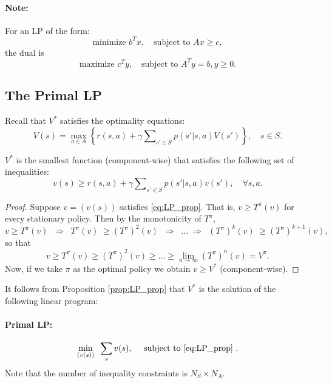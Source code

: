 \paragraph{Note:} For an LP of the form:
\begin{equation*}
 \textrm{minimize } {b^T}x,   \quad \textrm{subject to } Ax \ge c,
\end{equation*}
the dual is
\begin{equation*}
\textrm{maximize } {c^T}y,   \quad \textrm{subject to } {A^T}y = b,  y \ge 0.
\end{equation*}

\subsection{The Primal LP}
Recall that ${V^*}$ satisfies the optimality equations:
\[V(s) = \mathop {\max }\limits_{a \in A} \left\{ {r(s,a) + \gamma \sum\nolimits_{s' \in S} {p(s'|s,a)V(s')} } \right\},     \quad s \in S.\]
\begin{proposition}\label{prop:LP_prop}
${V^*}$ is the smallest function (component-wise) that satisfies the following set of
inequalities:
\begin{equation}\label{eq:LP_prop}
v(s) \ge r(s,a) + \gamma \sum\nolimits_{s' \in S} {p(s'|s,a)v(s')} ,\quad \forall s,a.
\end{equation}
\end{proposition}
\begin{proof}
Suppose $v = (v(s))$ satisfies \eqref{eq:LP_prop}. That is, $v \ge T_{}^\pi (v)$ for every stationary policy. Then by the monotonicity of $T_{}^\pi $,
\[v \ge T_{}^\pi (v)\;\; \Rightarrow \;\;T_{}^\pi (v)\; \ge {(T_{}^\pi )^2}(v)\;\; \Rightarrow \;\; \ldots \; \Rightarrow \;\;{(T_{}^\pi )^k}(v)\; \ge {(T_{}^\pi )^{k + 1}}(v),\]
so that
\[v \ge T_{}^\pi (v) \ge {(T_{}^\pi )^2}(v) \ge  \ldots  \ge \mathop {\lim }\limits_{n \to \infty } {(T_{}^\pi )^n}(v) = {V^\pi }.\]
Now, if we take $\pi$  as the optimal policy we obtain $v \ge {V^*}$ (component-wise).
\end{proof}
It follows from Proposition \ref{prop:LP_prop} that ${V^*}$ is the solution of the following linear program:
\paragraph{Primal LP:	}
\[\mathop {\min }\limits_{(v(s))} \;\;\sum\limits_s {v(s)}, \quad \textrm{ subject to \eqref{eq:LP_prop} } .\]
Note that the number of inequality constraints is ${N_S}\times{N_A}$.

